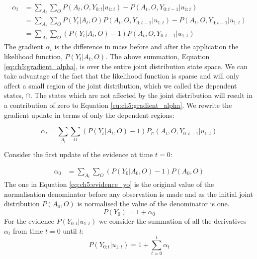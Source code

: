 \begin{appendices}
\begin{align}
 \alpha_t  &= \sum\limits_{A_t}\sum\limits_{O} P(A_t,O,Y_{0:t}|u_{1:t}) - P(A_t,O,Y_{0:t-1}|u_{1:t})  \\
	   &= \sum\limits_{A_t}\sum\limits_{O} P(Y_t|A_t,O)P(A_t,O,Y_{0:t-1}|u_{1:t}) - P(A_t,O,Y_{0:t-1}|u_{1:t}) \\
	   &= \sum\limits_{A_t}\sum\limits_{O} (P(Y_t|A_t,O) - 1)P(A_t,O,Y_{0:t-1}|u_{1:t}) \label{eq:ch5:gradient_alpha}
\end{align}
The gradient $\alpha_t$ is the difference in mass before and after the application the likelihood function, $P(Y_t|A_t,O)$. The above 
summation, Equation \ref{eq:ch5:gradient_alpha}, is over the entire joint distribution state space. We can take advantage of the fact 
that the likelihood function is sparse and will only affect a small region of the joint distribution, which we called the dependent states, $\cap$.
The states which are not affected by the joint distribution will result in a contribution of zero to Equation \ref{eq:ch5:gradient_alpha}. We 
rewrite the gradient update in terms of only the dependent regions:

\begin{equation}
 \alpha_t = \sum\limits_{A_t}\sum\limits_{O} (P(Y_t|A_t,O) - 1)P_{\cap}(A_t,O,Y_{0:t-1}|u_{1:t})
\end{equation}

Consider the first update of the evidence at time $t=0$:

\begin{align}
 \alpha_0 &= \sum\limits_{A_t}\sum\limits_{O} (P(Y_0|A_0,O) - 1)P(A_0,O) 
\end{align}
The one in Equation \ref{eq:ch5:evidence_yo} is the original value of the normalisation denominator before any observation is made and as the 
initial joint distribution $P(A_0,O)$ is normalised the value of the denominator is one.
\begin{equation}
 P(Y_0) = 1 + \alpha_0 \label{eq:ch5:evidence_yo}
\end{equation}
For the evidence $P(Y_{0:t}|u_{1:t})$ we consider the summation of all the derivatives $\alpha_t$ from time $t=0$ until $t$:
\begin{equation}
 P(Y_{0:t}|u_{1:t}) = 1 + \sum_{t=0}^t \alpha_t \label{eq:ch5:evidence_y}
\end{equation}




\end{appendices}
